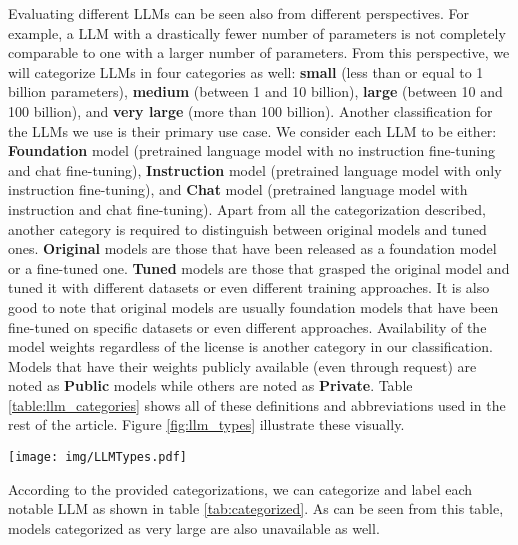 \documentclass[conference]{IEEEtran}
\begin{document}
Evaluating different LLMs can be seen also from different perspectives. For example, a LLM with a drastically fewer number of parameters is not completely comparable to one with a larger number of parameters. From this perspective, we will categorize LLMs in four categories as well: \textbf{small} (less than or equal to 1 billion parameters), \textbf{medium} (between 1 and 10 billion), \textbf{large} (between 10 and 100 billion), and \textbf{very large} (more than 100 billion). Another classification for the LLMs we use is their primary use case. We consider each LLM to be either: \textbf{Foundation} model (pretrained language model with no instruction fine-tuning and chat fine-tuning), \textbf{Instruction} model (pretrained language model with only instruction fine-tuning), and \textbf{Chat} model (pretrained language model with instruction and chat fine-tuning). Apart from all the categorization described, another category is required to distinguish between original models and tuned ones. \textbf{Original} models are those that have been released as a foundation model or a fine-tuned one. \textbf{Tuned} models are those that grasped the original model and tuned it with different datasets or even different training approaches. It is also good to note that original models are usually foundation models that have been fine-tuned on specific datasets or even different approaches. Availability of the model weights regardless of the license is another category in our classification. Models that have their weights publicly available (even through request) are noted as \textbf{Public} models while others are noted as \textbf{Private}. Table \ref{table:llm_categories} shows all of these definitions and abbreviations used in the rest of the article. 
Figure \ref{fig:llm_types} illustrate these visually.

\begin{figure*}[h]
    \centering
    \texttt{[image: img/LLMTypes.pdf]}
    \caption{LLM categorizations.}
    \label{fig:llm_types}
\end{figure*}




According to the provided categorizations, we can categorize and label each notable LLM as shown in table \ref{tab:categorized}. As can be seen from this table, models categorized as very large are also unavailable as well.
\end{document}
